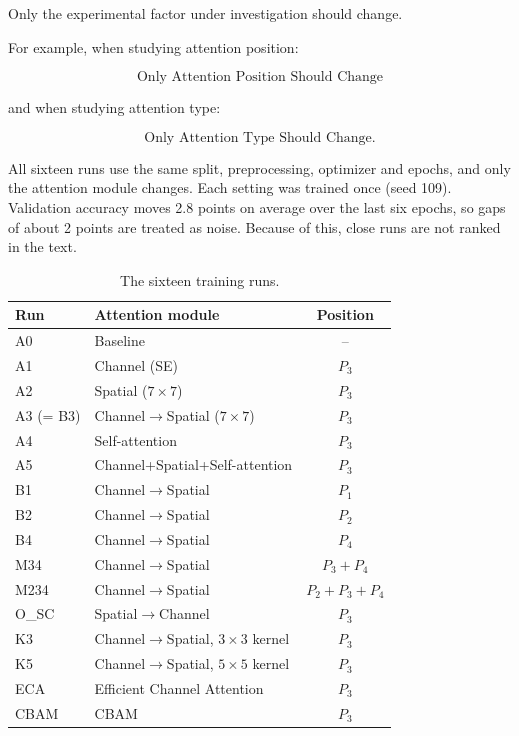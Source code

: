 \documentclass[10pt]{article}
\begin{document}
Only the experimental factor under investigation should change.

For example, when studying attention position:

\[
\boxed{
\text{Only Attention Position Should Change}
}
\]

and when studying attention type:

\[
\boxed{
\text{Only Attention Type Should Change}.
}
\]

All sixteen runs use the same split, preprocessing, optimizer and epochs, and only the attention module changes. Each setting was trained once (seed 109). Validation accuracy moves 2.8 points on average over the last six epochs, so gaps of about 2 points are treated as noise. Because of this, close runs are not ranked in the text.

\begin{table}[H]
\centering
\caption{The sixteen training runs.}
\begin{tabular}{|l|l|c|}
\hline
\textbf{Run} & \textbf{Attention module} & \textbf{Position}\\
\hline
A0 & Baseline & -- \\
\hline
A1 & Channel (SE) & $P_3$ \\
\hline
A2 & Spatial ($7\times7$) & $P_3$ \\
\hline
A3 (= B3) & Channel$\rightarrow$Spatial ($7\times7$) & $P_3$ \\
\hline
A4 & Self-attention & $P_3$ \\
\hline
A5 & Channel+Spatial+Self-attention & $P_3$ \\
\hline
B1 & Channel$\rightarrow$Spatial & $P_1$ \\
\hline
B2 & Channel$\rightarrow$Spatial & $P_2$ \\
\hline
B4 & Channel$\rightarrow$Spatial & $P_4$ \\
\hline
M34 & Channel$\rightarrow$Spatial & $P_3+P_4$ \\
\hline
M234 & Channel$\rightarrow$Spatial & $P_2+P_3+P_4$ \\
\hline
O\_SC & Spatial$\rightarrow$Channel & $P_3$ \\
\hline
K3 & Channel$\rightarrow$Spatial, $3\times3$ kernel & $P_3$ \\
\hline
K5 & Channel$\rightarrow$Spatial, $5\times5$ kernel & $P_3$ \\
\hline
ECA & Efficient Channel Attention & $P_3$ \\
\hline
CBAM & CBAM & $P_3$ \\
\hline
\end{tabular}
\end{table}
\end{document}
